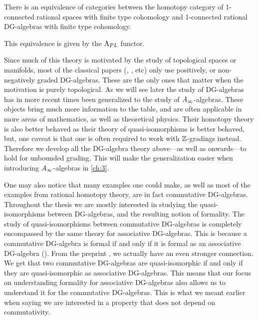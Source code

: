 \begin{theorem}
There is an equivalence of categories between the homotopy category of 1-connected rational spaces with finite type cohomology and 1-connected rational DG-algebras with finite type cohomology. 

This equivalence is given by the $\text{A}_{PL}$ functor. 
\end{theorem}

\begin{remark}
Since much of this theory is motivated by the study of topological spaces or manifolds, most of the classical papers (\cite{DGMS}, \cite{Sullivan}, \cite{PLdeRham} etc) only use positively, or non-negatively graded DG-algebras. These are the only ones that matter when the motivation is purely topological. As we will see later the study of DG-algebras has in more recent times been generalized to the study of $A_{\infty}$-algebras. These objects bring much more information to the table, and are often applicable in more areas of mathematics, as well as theoretical physics. Their homotopy theory is also better behaved as their theory of quasi-isomorphisms is better behaved, but, one caveat is that one is often required to work with $\mathbb{Z}$-gradings instead. Therefore we develop all the DG-algebra theory above---as well as onwards---to hold for unbounded grading. This will make the generalization easier when introducing $A_{\infty}$-algebras in \cref{ch:3}. 
\end{remark}

One may also notice that many examples one could make, as well as most of the examples from rational homotopy theory, are in fact commutative DG-algebras. Throughout the thesis we are mostly interested in studying the quasi-isomorphisms between DG-algebras, and the resulting notion of formality. The study of quasi-isomorphisms between commutative DG-algebras is completely encompassed by the same theory for associative DG-algebras. This is because a commutative DG-algebra is formal if and only if it is formal as an associative DG-algebra (\cite{Saleh}). From the preprint \cite{Petersen}, we actually have an even stronger connection. We get that two commutative DG-algebras are quasi-isomorphic if and only if they are quasi-isomorphic as associative DG-algebras. This means that our focus on understanding formality for associative DG-algebras also allows us to understand it for the commutative DG-algebras. This is what we meant earlier when saying we are interested in a property that does not depend on commutativity. 

